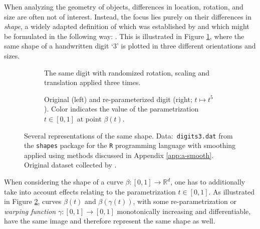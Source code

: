 When analyzing the geometry of objects, differences in location, rotation, and size are often not of interest.
Instead, the focus lies purely on their differences in  \textit{shape}, a widely adapted definition of which was established by \cite{Kendall1977} and which might be formulated in the following way: .
This is illustrated in Figure \ref{fig:1-eucl}, where the same shape of a handwritten digit \enquote*{3} is plotted in three different orientations and sizes.
\begin{figure}
  \centering
  \begin{subfigure}{.48\textwidth}
    \centering
    \caption{The same digit with randomized rotation, scaling and translation applied three times.\\}
    \label{fig:1-eucl}
  \end{subfigure}\hfill%
  \begin{subfigure}{.48\textwidth}
    \centering
    \caption{Original (left) and re-parameterized digit (right; $t \mapsto t^5$). Color indicates the value of the parametrization $t \in [0,1]$ at point $\beta(t)$.}
    \label{fig:1-warp}
  \end{subfigure}
  \caption{Several representations of the same shape. Data:\ \texttt{digits3.dat} from the \texttt{shapes} package \parencite{shapes} for the \texttt{R} programming language \parencite{R} with smoothing applied using methods discussed in Appendix \ref{app:a-smooth}. Original dataset collected by \cite{Anderson1997}.}
  \label{fig:1-shape}
\end{figure}
When considering the shape of a curve $\beta : [0,1] \rightarrow \mathbb{R}^d$, one has to additionally take into account effects relating to the parametrization $t \in [0,1]$.
As illustrated in Figure \ref{fig:1-warp}, curves $\beta(t)$ and $\beta(\gamma(t))$, with some re-parametrization or \textit{warping function} $\gamma : [0,1] \rightarrow [0,1]$ monotonically increasing and differentiable, have the same image and therefore represent the same shape as well.

